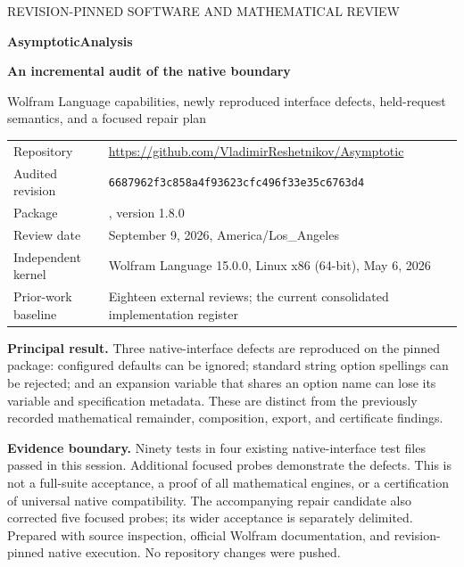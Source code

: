 \documentclass[11pt,a4paper]{article}
\newcommand{\code}[1]{\texttt{\detokenize{#1}}}
\begin{document}
\begin{titlepage}
\vspace*{13mm}
{\large\sffamily\textcolor{muted}{REVISION-PINNED SOFTWARE AND MATHEMATICAL REVIEW}\par}
\vspace{9mm}
{\Huge\bfseries\textcolor{ink}{AsymptoticAnalysis}\par}
\vspace{4mm}
{\LARGE\bfseries An incremental audit of the native boundary\par}
\vspace{8mm}
{\large Wolfram Language capabilities, newly reproduced interface defects, held-request semantics, and a focused repair plan\par}
\vspace{12mm}
\begin{tabular}{@{}P{35mm}P{112mm}@{}}
\toprule
Repository & \url{https://github.com/VladimirReshetnikov/Asymptotic}\\[4pt]
Audited revision & \texttt{6687962f3c858a4f93623cfc496f33e35c6763d4}\\[4pt]
Package & \code{AsymptoticAnalysis}, version 1.8.0\\[4pt]
Review date & September 9, 2026, America/Los\_Angeles\\[4pt]
Independent kernel & Wolfram Language 15.0.0, Linux x86 (64-bit), May 6, 2026\\[4pt]
Prior-work baseline & Eighteen external reviews; the current consolidated implementation register\\
\bottomrule
\end{tabular}
\vspace{10mm}
\textbf{Principal result.} Three native-interface defects are reproduced on the pinned package: configured defaults can be ignored; standard string option spellings can be rejected; and an expansion variable that shares an option name can lose its variable and specification metadata. These are distinct from the previously recorded mathematical remainder, composition, export, and certificate findings.

\textbf{Evidence boundary.} Ninety tests in four existing native-interface test files passed in this session. Additional focused probes demonstrate the defects. This is not a full-suite acceptance, a proof of all mathematical engines, or a certification of universal native compatibility. The accompanying repair candidate also corrected five focused probes; its wider acceptance is separately delimited.
\vfill
{\small Prepared with source inspection, official Wolfram documentation, and revision-pinned native execution. No repository changes were pushed.}
\end{titlepage}
\tableofcontents
\newpage
\end{document}
